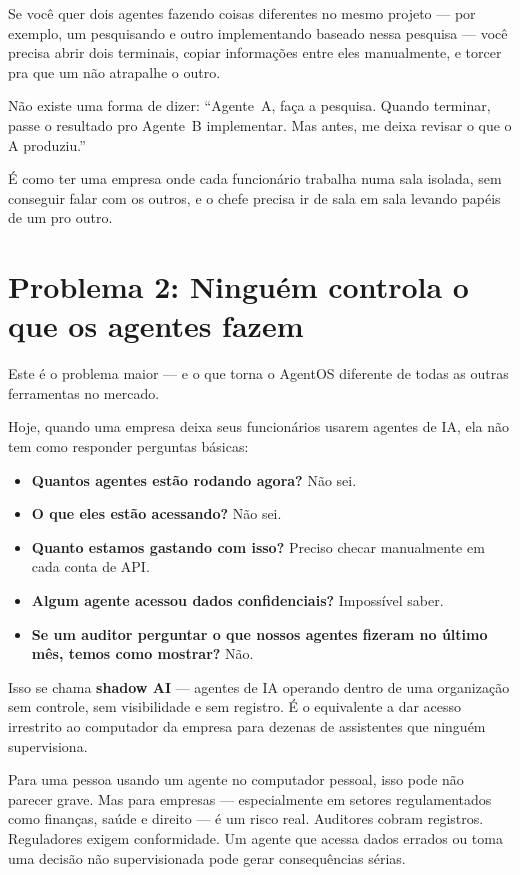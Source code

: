 \documentclass[12pt, a4paper]{article}
\begin{document}
Se você quer dois agentes fazendo coisas diferentes no mesmo projeto --- por exemplo, um pesquisando e outro implementando baseado nessa pesquisa --- você precisa abrir dois terminais, copiar informações entre eles manualmente, e torcer pra que um não atrapalhe o outro.

Não existe uma forma de dizer: ``Agente~A, faça a pesquisa. Quando terminar, passe o resultado pro Agente~B implementar. Mas antes, me deixa revisar o que o A produziu.''

É como ter uma empresa onde cada funcionário trabalha numa sala isolada, sem conseguir falar com os outros, e o chefe precisa ir de sala em sala levando papéis de um pro outro.

\section{Problema 2: Ninguém controla o que os agentes fazem}

Este é o problema maior --- e o que torna o AgentOS diferente de todas as outras ferramentas no mercado.

Hoje, quando uma empresa deixa seus funcionários usarem agentes de IA, ela não tem como responder perguntas básicas:

\begin{itemize}[leftmargin=1.5em]
    \item \textbf{Quantos agentes estão rodando agora?} Não sei.
    \item \textbf{O que eles estão acessando?} Não sei.
    \item \textbf{Quanto estamos gastando com isso?} Preciso checar manualmente em cada conta de API.
    \item \textbf{Algum agente acessou dados confidenciais?} Impossível saber.
    \item \textbf{Se um auditor perguntar o que nossos agentes fizeram no último mês, temos como mostrar?} Não.
\end{itemize}

Isso se chama \textbf{shadow AI} --- agentes de IA operando dentro de uma organização sem controle, sem visibilidade e sem registro. É o equivalente a dar acesso irrestrito ao computador da empresa para dezenas de assistentes que ninguém supervisiona.

Para uma pessoa usando um agente no computador pessoal, isso pode não parecer grave. Mas para empresas --- especialmente em setores regulamentados como finanças, saúde e direito --- é um risco real. Auditores cobram registros. Reguladores exigem conformidade. Um agente que acessa dados errados ou toma uma decisão não supervisionada pode gerar consequências sérias.
\end{document}
